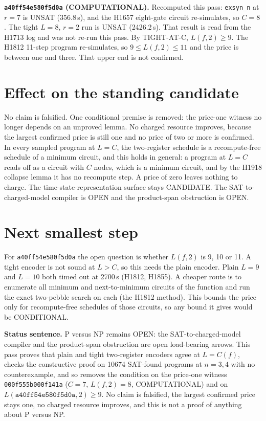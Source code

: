 \documentclass[11pt]{article}
\begin{document}
\textbf{\texttt{a40ff54e580f5d0a} (COMPUTATIONAL).} Recomputed this pass: \texttt{exsyn\_n} at $r=7$ is UNSAT (356.8\,s), and the H1657 eight-gate circuit re-simulates, so $C=8$. The tight $L=8$, $r=2$ run is UNSAT (2426.2\,s). That result is read from the H1713 log and was not re-run this pass. By TIGHT-AT-C, $L(f,2)\ge 9$. The H1812 11-step program re-simulates, so $9\le L(f,2)\le 11$ and the price is between one and three. That upper end is not confirmed.

\section*{Effect on the standing candidate}
No claim is falsified. One conditional premise is removed: the price-one witness no longer depends on an unproved lemma. No charged resource improves, because the largest confirmed price is still one and no price of two or more is confirmed. In every sampled program at $L=C$, the two-register schedule is a recompute-free schedule of a minimum circuit, and this holds in general: a program at $L=C$ reads off as a circuit with $C$ nodes, which is a minimum circuit, and by the H1918 collapse lemma it has no recompute step. A price of zero leaves nothing to charge. The time-state-representation surface stays CANDIDATE. The SAT-to-charged-model compiler is OPEN and the product-span obstruction is OPEN.

\section*{Next smallest step}
For \texttt{a40ff54e580f5d0a} the open question is whether $L(f,2)$ is 9, 10 or 11. A tight encoder is not sound at $L>C$, so this needs the plain encoder. Plain $L=9$ and $L=10$ both timed out at 2700\,s (H1812, H1855). A cheaper route is to enumerate all minimum and next-to-minimum circuits of the function and run the exact two-pebble search on each (the H1812 method). This bounds the price only for recompute-free schedules of those circuits, so any bound it gives would be CONDITIONAL.

\bigskip
\noindent\textbf{Status sentence.} P versus NP remains OPEN: the SAT-to-charged-model compiler and the product-span obstruction are open load-bearing arrows. This pass proves that plain and tight two-register encoders agree at $L=C(f)$, checks the constructive proof on 10674 SAT-found programs at $n=3,4$ with no counterexample, and so removes the condition on the price-one witness \texttt{000f555b000f141a} ($C=7$, $L(f,2)=8$, COMPUTATIONAL) and on $L(\texttt{a40ff54e580f5d0a},2)\ge 9$. No claim is falsified, the largest confirmed price stays one, no charged resource improves, and this is not a proof of anything about P versus NP.
\end{document}
